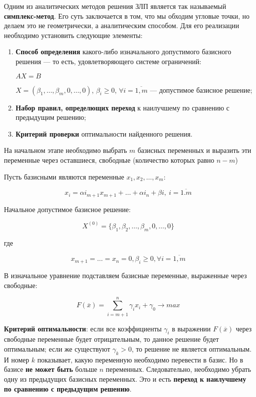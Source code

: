 \documentclass{article}
\begin{document}
Одним из аналитических методов решения ЗЛП является так называемый \textbf{симплекс-метод}. Его суть заключается в том, что мы обходим угловые точки, но делаем это не геометрически, а аналитическим способом. Для его реализации необходимо установить следующие элементы:

\begin{enumerate}
    \item \textbf{Способ определения} какого-либо изначального допустимого базисного решения — то есть, удовлетворяющего системе ограничений:
    
    $AX = B$

    $X = (\beta_1, \dots, \beta_m, 0, \dots, 0)$, $\beta_{i} \ge 0$, $\forall i = \overline{1, m}$ — допустимое базисное решение;
    \item \textbf{Набор правил, определющих переход} к наилучшему по сравнению с предыдущим решению;
    \item \textbf{Критерий проверки} оптимальности найденного решения.
\end{enumerate}

На начальном этапе необходимо выбрать $m$ базисных переменных и выразить эти переменные через оставшиеся, свободные (количество которых равно $n - m$)

Пусть базисными являются переменные $x_1, x_2, \dots, x_{m}$:

$$
x_{i} = \alpha i_{m + 1} x_{m + 1} + \dots + \alpha i_{n} + \beta i, \ i = \overline{1. m}
$$

Начальное допустимое базисное решение:

$$
X^{(0)} = \{ \beta_1, \beta_2, \dots, \beta_m, 0, \dots, 0 \}
$$

где 

$$x_{m + 1} = \dots = x_{n} = 0, \beta_{i} \ge 0, \forall i = \overline{1, m}$$

В изначальное уравнение подставляем базисные переменные, выраженные через свободные:

$$
F(\overline{x}) = \sum\limits_{i = m + 1}^{n} \gamma_{i} x_i + \gamma_0 \to max
$$

\textbf{Критерий оптимальности}: если все коэффициенты $\gamma_{i}$ в выражении $F(\overline{x})$ через свободные переменные будет отрицательным, то данное решение будет оптимальным; если же существуют $\gamma_{k} > 0$, то решение не является оптимальным. И номер $k$ показывает, какую переменную необходимо перевести в базис. Но в базисе \textbf{не может быть} больше $n$ переменных. Следовательно, необходимо убрать одну из предыдущих базисных переменных. Это и есть \textbf{переход к наилучшему по сравнению с предыдущим решению}.
\end{document}
